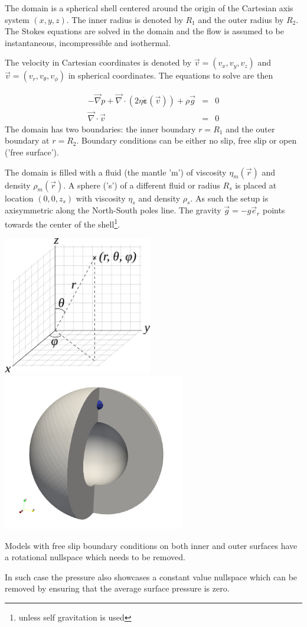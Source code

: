 

The domain is a spherical shell centered around the origin of the Cartesian 
axis system $(x,y,z)$. 
The inner radius is denoted by $R_1$ and the outer radius by $R_2$.
The Stokes equations are solved in the domain and the flow is assumed 
to be instantaneous, incompressible and isothermal.

The velocity in Cartesian coordinates is denoted by $\vec{v}=(v_x,v_y,v_z)$ and 
$\vec{v}=(v_r,v_\theta,v_\phi)$ in spherical coordinates. 
The equations to solve are then

\begin{eqnarray}
- \vec\nabla p + \vec\nabla \cdot (2 \eta \dot{\bm \varepsilon}(\vec v))  + \rho \vec{g} &=& 0 \\
\vec\nabla \cdot \vec{v} &=& 0
\end{eqnarray}
The domain has two boundaries: the inner boundary $r=R_1$ and the outer boundary at $r=R_2$.
Boundary conditions can be either no slip, free slip or open ('free surface').

The domain is filled with a fluid (the mantle 'm') of viscosity $\eta_m(\vec{r})$ 
and density $\rho_m(\vec{r})$.
A sphere ('s') of a different fluid or radius $R_s$ is placed at location $(0,0,z_s)$ with 
viscosity $\eta_s$ and density $\rho_s$. As such the setup is 
axisymmetric along the North-South poles line.
The gravity $\vec{g}=-g \vec{e}_r$ points towards the center of the shell\footnote{unless 
self gravitation is used}.

\begin{center}
\includegraphics[width=6.5cm]{images/sphcoord}
\includegraphics[width=8cm]{images/setup}
\end{center}

Models with free slip boundary conditions on both inner and outer surfaces have a rotational nullspace which needs to be removed. 

In such case the pressure also showcases a constant value nullspace which can be removed by ensuring that the average surface pressure is zero.
